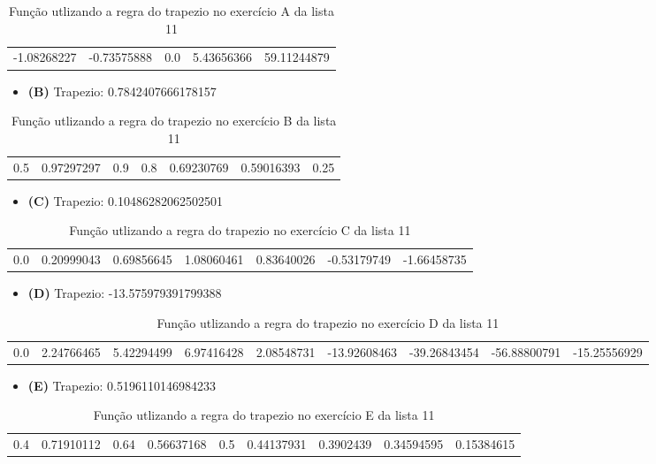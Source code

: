 \documentclass[12pt]{article}
\begin{document}
\begin{table}[ht]
\centering
\begin{tabular}{|lllll|}
-1.08268227 & -0.73575888 & 0.0 & 5.43656366 & 59.11244879
\end{tabular}
    \caption{Função utlizando a regra do trapezio no exercício A da lista 11}
\end{table}


\begin{itemize}
    \item \textbf{(B)} Trapezio: 0.7842407666178157
\end{itemize}

\begin{table}[ht]
\centering
\begin{tabular}{|lllllll|}
  0.5 & 0.97297297 & 0.9 & 0.8 & 0.69230769 & 0.59016393 & 0.25
\end{tabular}
    \caption{Função utlizando a regra do trapezio no exercício B da lista 11}
\end{table}


\begin{itemize}
    \item \textbf{(C)} Trapezio: 0.10486282062502501
\end{itemize}

\begin{table}[ht]
\centering
\begin{tabular}{|lllllll|}
  0.0 & 0.20999043 & 0.69856645 & 1.08060461 & 0.83640026 & -0.53179749 & -1.66458735
\end{tabular}
    \caption{Função utlizando a regra do trapezio no exercício C da lista 11}
\end{table}


\begin{itemize}
    \item \textbf{(D)} Trapezio: -13.575979391799388
\end{itemize}
\begin{table}[ht]
\centering
\begin{tabular}{|lllllllll|}
0.0 & 2.24766465 & 5.42294499 & 6.97416428 & 2.08548731 & -13.92608463 & -39.26843454 & -56.88800791 & -15.25556929
\end{tabular}
    \caption{Função utlizando a regra do trapezio no exercício D da lista 11}
\end{table}


\begin{itemize}
    \item \textbf{(E)} Trapezio: 0.5196110146984233
\end{itemize}
\begin{table}[ht]
\centering
\begin{tabular}{|lllllllll|}
  0.4  & 0.71910112  & 0.64 & 0.56637168 & 0.5 & 0.44137931 & 0.3902439 & 0.34594595 & 0.15384615
\end{tabular}
    \caption{Função utlizando a regra do trapezio no exercício E da lista 11}
\end{table}
\end{document}
